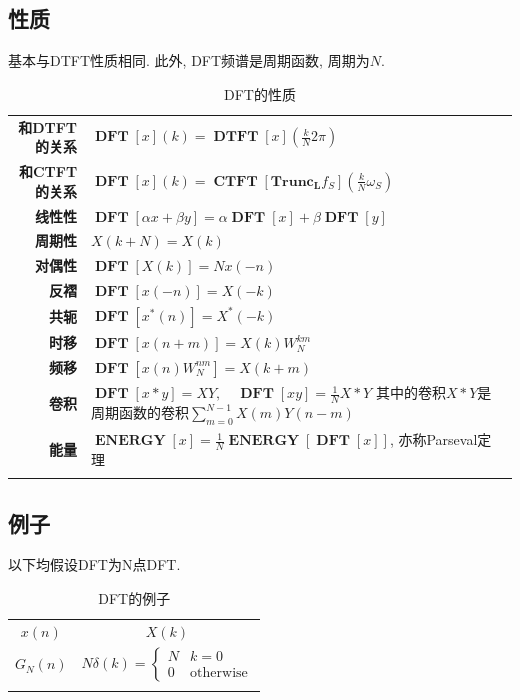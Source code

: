 \documentclass{ctexart}
\DeclareMathOperator{\CTFT}{\mathbf{CTFT}}
\DeclareMathOperator{\DTFT}{\mathbf{DTFT}}
\DeclareMathOperator{\DFT}{\mathbf{DFT}}
\DeclareMathOperator{\ENERGY}{\mathbf{ENERGY}}
\newlength{\Oldarrayrulewidth}
\newcommand{\Hline}[1]{
  \noalign{\global\setlength{\Oldarrayrulewidth}{\arrayrulewidth}}
  \noalign{\global\setlength{\arrayrulewidth}{#1}}\hline
  \noalign{\global\setlength{\arrayrulewidth}{\Oldarrayrulewidth}}}
\newcommand{\Topline}{\Hline{0.08em}}
\newcommand{\Bottomline}{\Hline{0.08em}}
\newcommand{\Midline}{\Hline{0.05em}}
\begin{document}
\subsection{性质}
    基本与DTFT性质相同. 此外, DFT频谱是周期函数, 周期为$N$.
    \begin{table}[ht!]
    \begin{tabularx}{\textwidth}{|>{\bfseries}r  L|}
        \Topline
        和DTFT的关系 &  $\DFT[x](k) = \DTFT[x](\frac{k}{N} 2\pi)$    \\
        和CTFT的关系 &  $\DFT[x](k) = \CTFT[\mathbf{Trunc_L} f_{S}](\frac{k}{N} \omega_S)$    \\
        线性性 &  $\displaystyle \DFT[\alpha x + \beta y] = \alpha \DFT[x] + \beta \DFT[y]$    \\
        周期性 &  $\displaystyle X(k + N) = X(k)$    \\
        对偶性 &  $\displaystyle \DFT[X(k)] = N x(-n)$    \\
        反褶 &  $\displaystyle \DFT[x(-n)] = X(-k)$    \\
        共轭 &  $\displaystyle \DFT[x^*(n)] = X^*(-k)$    \\
        时移 &  $\displaystyle \DFT[x(n + m)] = X(k) W_N^{km}$    \\
        频移 &  $\displaystyle \DFT[x(n) W_N^{nm}] = X(k + m)$    \\
        卷积 &  $\displaystyle \DFT[x * y] = X Y,\quad \DFT[x y] = \frac{1}{N} X * Y$\newline
            其中的卷积$X * Y$是周期函数的卷积$\sum_{m = 0}^{N-1} X(m) Y(n-m)$   \\
        能量 &  $\displaystyle \ENERGY[x] = \frac{1}{N} \ENERGY[\DFT[x]]$, 亦称Parseval定理\\
        \Bottomline
    \end{tabularx}
    \caption{DFT的性质}
    \end{table}

\subsection{例子}
    以下均假设DFT为N点DFT.
    \begin{table}[ht!]
    \centering
    \begin{tabularx}{\textwidth}{|CC|}
            \Topline $\displaystyle x(n)$ & $\displaystyle X(k)$ \\ \Midline
            $\displaystyle G_N(n)$ & $\displaystyle N\delta(k) = \begin{cases} N & k = 0\\ 0 & \text{otherwise}\end{cases}$
            \\
            \Bottomline
    \end{tabularx}
    \caption{DFT的例子}
    \end{table}
\end{document}
